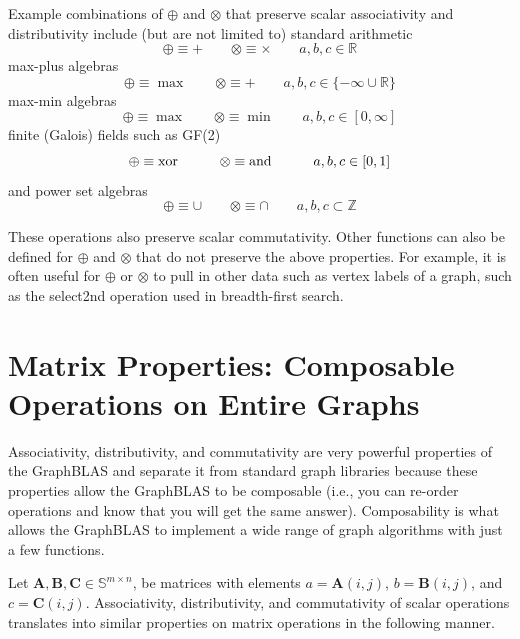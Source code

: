   Example combinations of $\oplus$ and $\otimes$ that preserve scalar associativity and distributivity include (but are not limited to) standard arithmetic
$$
  \oplus \equiv + ~~~~~~~~~ \otimes \equiv \times ~~~~~~~~~ a, b, c \in \mathbb{R}
$$
max-plus algebras
$$
  \oplus \equiv \max ~~~~~~~~~ \otimes \equiv + ~~~~~~~~~ a, b, c \in \{-\infty \cup \mathbb{R}\}
$$
max-min algebras
$$
  \oplus \equiv \max ~~~~~~~~~ \otimes \equiv \min ~~~~~~~~~ a, b, c \in [0,\infty]
$$
finite (Galois) fields such as GF(2)
$$
  \oplus \equiv {\rm xor} ~~~~~~~~~ \otimes \equiv {\rm and} ~~~~~~~~~ a, b, c \in [0,1]
$$
and power set algebras
$$
  \oplus \equiv \cup ~~~~~~~~~ \otimes \equiv \cap ~~~~~~~~~ a, b, c \subset \mathbb{Z}
$$

These operations also preserve scalar commutativity. Other functions can also be defined for $\oplus$ and $\otimes$ that do not preserve the above properties.  For example, it is often useful for $\oplus$ or $\otimes$ to pull in other data such as vertex labels of a graph, such as the select2nd operation used in breadth-first search. 

\section{Matrix Properties: Composable Operations on Entire Graphs}
  Associativity, distributivity, and commutativity are very powerful properties of the GraphBLAS and separate it from standard graph libraries because these properties allow the GraphBLAS to be composable (i.e., you can re-order operations and know that you will get the same answer).  Composability is what allows the GraphBLAS to implement a wide range of graph algorithms with just a few functions.

  Let $\mathbf{A}, \mathbf{B}, \mathbf{C} \in \mathbb{S}^{m \times n}$, be matrices with elements $a = \mathbf{A}(i,j)$, $b = \mathbf{B}(i,j)$, and $c = \mathbf{C}(i,j)$.  Associativity, distributivity, and commutativity of scalar operations translates into similar properties on matrix operations in the following manner.

